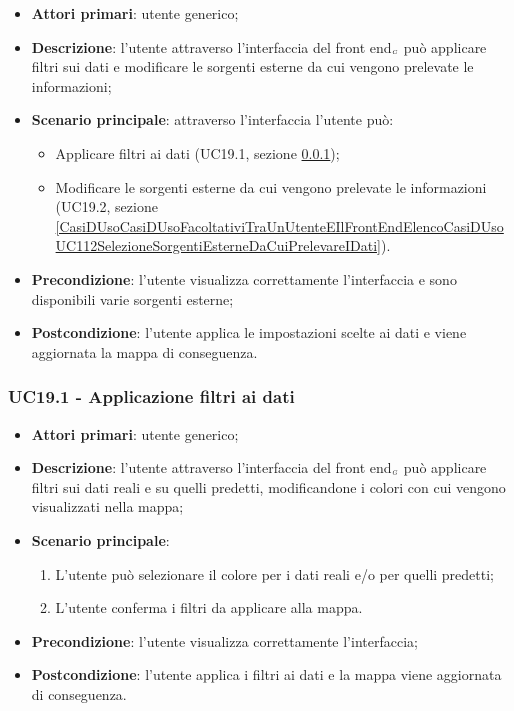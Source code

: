 \begin{itemize}
	\item \textbf{Attori primari}: utente generico;
	\item \textbf{Descrizione}: l'utente attraverso l'interfaccia del front end$_{\scaleto{G}{3pt}}$ può applicare filtri sui dati e modificare le sorgenti esterne da cui vengono prelevate le informazioni;
	\item \textbf{Scenario principale}: attraverso l'interfaccia l'utente può:
	\begin{itemize}
		\item Applicare filtri ai dati (UC19.1, sezione  \ref{CasiDUsoCasiDUsoFacoltativiTraUnUtenteEIlFrontEndElencoCasiDUsoUC111ApplicazioneFiltriAiDati});
		\item Modificare le sorgenti esterne da cui vengono prelevate le informazioni (UC19.2, sezione \ref{CasiDUsoCasiDUsoFacoltativiTraUnUtenteEIlFrontEndElencoCasiDUsoUC112SelezioneSorgentiEsterneDaCuiPrelevareIDati}).
	\end{itemize}
	\item \textbf{Precondizione}: l'utente visualizza correttamente l'interfaccia e sono disponibili varie sorgenti esterne;
	\item \textbf{Postcondizione}: l'utente applica le impostazioni scelte ai dati e viene aggiornata la mappa di conseguenza.
\end{itemize}

\subsubsection{UC19.1 - Applicazione filtri ai dati}\label{CasiDUsoCasiDUsoFacoltativiTraUnUtenteEIlFrontEndElencoCasiDUsoUC111ApplicazioneFiltriAiDati}
\begin{itemize}
	\item \textbf{Attori primari}: utente generico;
	\item \textbf{Descrizione}: l'utente attraverso l'interfaccia del front end$_{\scaleto{G}{3pt}}$ può applicare filtri sui dati reali e su quelli predetti, modificandone i colori con cui vengono visualizzati nella mappa;
	\item \textbf{Scenario principale}:
	\begin{enumerate}
		\item L'utente può selezionare il colore per i dati reali e/o per quelli predetti;
		\item L'utente conferma i filtri da applicare alla mappa.
	\end{enumerate}
	\item \textbf{Precondizione}: l'utente visualizza correttamente l'interfaccia;
	\item \textbf{Postcondizione}: l'utente applica i filtri ai dati e la mappa viene aggiornata di conseguenza.
\end{itemize}

